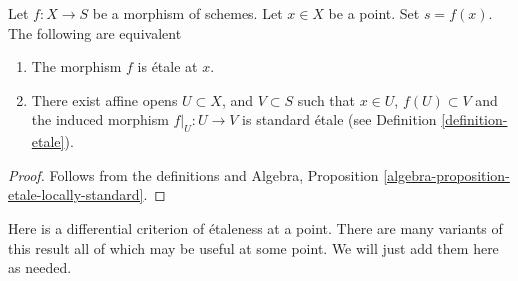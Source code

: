 \begin{lemma}
\label{lemma-etale-locally-standard-etale}
Let $f : X  \to S$ be a morphism of schemes.
Let $x \in X$ be a point.
Set $s = f(x)$.
The following are equivalent
\begin{enumerate}
\item The morphism $f$ is \'etale at $x$.
\item There exist affine opens $U \subset X$,
and $V \subset S$ such that $x \in U$, $f(U) \subset V$ and the
induced morphism $f|_U : U \to V$ is standard \'etale
(see Definition \ref{definition-etale}).
\end{enumerate}
\end{lemma}

\begin{proof}
Follows from the definitions and
Algebra, Proposition \ref{algebra-proposition-etale-locally-standard}.
\end{proof}

\noindent
Here is a differential criterion of \'etaleness at a point.
There are many variants of this result
all of which may be useful at some point. We will just add them
here as needed.

